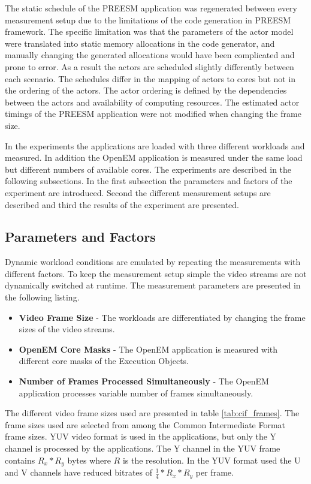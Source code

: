 The static schedule of the PREESM application was regenerated between every measurement setup due to the limitations of the code generation in PREESM framework. The specific limitation was that the parameters of the actor model were translated into static memory allocations in the code generator, and manually changing the generated allocations would have been complicated and prone to error. As a result the actors are scheduled slightly differently between each scenario. The schedules differ in the mapping of actors to cores but not in the ordering of the actors. The actor ordering is defined by the dependencies between the actors and availability of computing resources. The estimated actor timings of the PREESM application were not modified when changing the frame size.

In the experiments the applications are loaded with three different workloads and measured. In addition the OpenEM application is measured under the same load but different numbers of available cores. The experiments are described in the following subsections. In the first subsection the parameters and factors of the experiment are introduced. Second the different measurement setups are described and third the results of the experiment are presented.

\subsection{Parameters and Factors}
\label{subsec:parameters-and-factors}
Dynamic workload conditions are emulated by repeating the measurements with different factors. To keep the measurement setup simple the video streams are not dynamically switched at runtime. The measurement parameters are presented in the following listing.

\begin{itemize}
    \item \textbf{Video Frame Size} - The workloads are differentiated by changing the frame sizes of the video streams.
    \item \textbf{OpenEM Core Masks} - The OpenEM application is measured with different core masks of the Execution Objects.
    \item \textbf{Number of Frames Processed Simultaneously} - The OpenEM application processes variable number of frames simultaneously.
\end{itemize}

The different video frame sizes used are presented in table \ref{tab:cif_frames}. The frame sizes used are selected from among the Common Intermediate Format frame sizes. YUV video format is used in the applications, but only the Y channel is processed by the applications. The Y channel in the YUV frame contains $R_{x} * R_{y}$ bytes where $R$ is the resolution. In the YUV format used the U and V channels have reduced bitrates of $\frac{1}{4} * R_{x} * R_{y}$ per frame.

